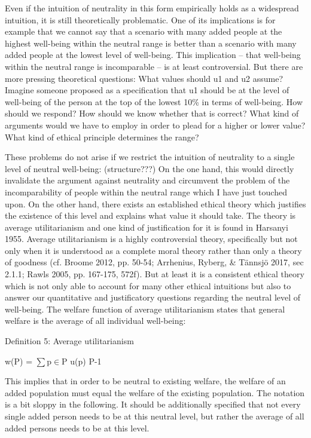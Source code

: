 Even if the intuition of neutrality in this form empirically holds as a widespread intuition, it is still theoretically problematic. One of its implications is for example that we cannot say that a scenario with many added people at the highest well-being within the neutral range is better than a scenario with many added people at the lowest level of well-being. This implication – that well-being within the neutral range is incomparable – is at least controversial. But there are more pressing theoretical questions: What values should u1 and u2 assume? Imagine someone proposed as a specification that u1 should be at the level of well-being of the person at the top of the lowest 10\% in terms of well-being. How should we respond? How should we know whether that is correct? What kind of arguments would we have to employ in order to plead for a higher or lower value? What kind of ethical principle determines the range? 

These problems do not arise if we restrict the intuition of neutrality to a single level of neutral well-being: (structure???) On the one hand, this would directly invalidate the argument against neutrality and circumvent the problem of the incomparability of people within the neutral range which I have just touched upon. On the other hand, there exists an established ethical theory which justifies the existence of this level and explains what value it should take. The theory is average utilitarianism and one kind of justification for it is found in \label{ref:RNDwOOuENjFv9}Harsanyi 1955. Average utilitarianism is a highly controversial theory, specifically but not only when it is understood as a complete moral theory rather than only a theory of goodness (cf. \label{ref:RND9Y2Bm9Fcuq}Broome 2012, pp. 50-54; \label{ref:RNDDzRwTCjv0i}Arrhenius, Ryberg, \& Tännsjö 2017, sec 2.1.1; \label{ref:RNDyIVTex1fnq}Rawls 2005, pp. 167-175, 572f). But at least it is a consistent ethical theory which is not only able to account for many other ethical intuitions but also to answer our quantitative and justificatory questions regarding the neutral level of well-being. The welfare function of average utilitarianism states that general welfare is the average of all individual well-being: 

Definition 5: Average utilitarianism 

w(P) = ${\sum}$p${\in}$P u(p) {\textbullet} {\textbar}P{\textbar}{}-1 

This implies that in order to be neutral to existing welfare, the welfare of an added population must equal the welfare of the existing population. The notation is a bit sloppy in the following. It should be additionally specified that not every single added person needs to be at this neutral level, but rather the average of all added persons needs to be at this level.  

